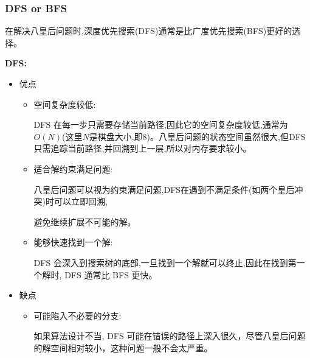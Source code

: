 \documentclass{article}
\begin{document}
\hspace*{\fill}\par

\subsubsection{DFS or BFS} 
在解决八皇后问题时,深度优先搜索(DFS)通常是比广度优先搜索(BFS)更好的选择。\par
\hspace*{\fill}\par\hspace*{\fill}\par\hspace*{\fill}\par

\textbf{DFS:}\par
\begin{itemize}
    \item 优点
        \begin{itemize}
            \item 空间复杂度较低:\par
            DFS 在每一步只需要存储当前路径,因此它的空间复杂度较低,通常为 $O(N)$(这里$N$是棋盘大小,即8)。八皇后问题的状态空间虽然很大,但DFS只需追踪当前路径,并回溯到上一层,所以对内存要求较小。
            \item 适合解约束满足问题:\par
            八皇后问题可以视为约束满足问题,DFS在遇到不满足条件(如两个皇后冲突)时可以立即回溯,\par
            避免继续扩展不可能的解。
            \item 能够快速找到一个解:\par
            DFS 会深入到搜索树的底部,一旦找到一个解就可以终止,因此在找到第一个解时, DFS 通常比 BFS 更快。
        \end{itemize}
    \item 缺点
        \begin{itemize}
            \item 可能陷入不必要的分支:\par
            如果算法设计不当, DFS 可能在错误的路径上深入很久，尽管八皇后问题的解空间相对较小，这种问题一般不会太严重。
        \end{itemize}
\end{itemize}
\end{document}

